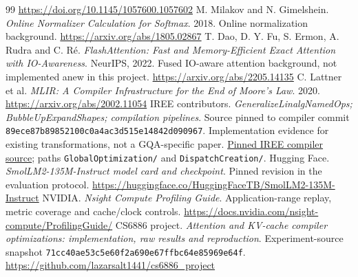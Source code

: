 \documentclass[10pt,a4paper]{article}
\newcommand{\code}[1]{\texttt{#1}}
\begin{document}
\begin{thebibliography}{99}
\url{https://doi.org/10.1145/1057600.1057602}
 M. Milakov and N. Gimelshein. \emph{Online Normalizer Calculation for Softmax}. 2018. Online normalization background.
\url{https://arxiv.org/abs/1805.02867}
 T. Dao, D. Y. Fu, S. Ermon, A. Rudra and C. R\'e. \emph{FlashAttention: Fast and Memory-Efficient Exact Attention with IO-Awareness}. NeurIPS, 2022. Fused IO-aware attention background, not implemented anew in this project.
\url{https://arxiv.org/abs/2205.14135}
 C. Lattner et al. \emph{MLIR: A Compiler Infrastructure for the End of Moore's Law}. 2020.
\url{https://arxiv.org/abs/2002.11054}
 IREE contributors. \emph{GeneralizeLinalgNamedOps; BubbleUpExpandShapes; compilation pipelines}. Source pinned to compiler commit \code{89ece87b89852100c0a4ac3d515e14842d090967}. Implementation evidence for existing transformations, not a GQA-specific paper.
\href{https://github.com/iree-org/iree/tree/89ece87b89852100c0a4ac3d515e14842d090967/compiler/src/iree/compiler}{Pinned IREE compiler source}; paths \code{GlobalOptimization/} and \code{DispatchCreation/}.
 Hugging Face. \emph{SmolLM2-135M-Instruct model card and checkpoint}. Pinned revision in the evaluation protocol.
\url{https://huggingface.co/HuggingFaceTB/SmolLM2-135M-Instruct}
 NVIDIA. \emph{Nsight Compute Profiling Guide}. Application-range replay, metric coverage and cache/clock controls.
\url{https://docs.nvidia.com/nsight-compute/ProfilingGuide/}
 CS6886 project. \emph{Attention and KV-cache compiler optimizations: implementation, raw results and reproduction}. Experiment-source snapshot \code{71cc40ae53c5e60f2a690e67ffbc64e85969e64f}.
\url{https://github.com/lazarsalt1441/cs6886_project}
\end{thebibliography}
\endgroup
\end{document}
